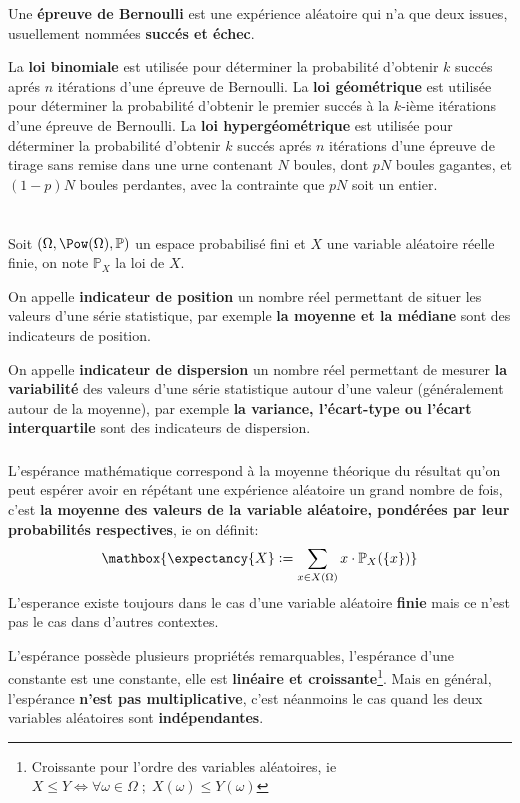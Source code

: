 Une \textbf{épreuve de Bernoulli} est une expérience aléatoire qui n'a que deux issues, usuellement nommées \textbf{succés et échec}.\<

La \textbf{loi binomiale} est utilisée pour déterminer la probabilité d'obtenir \(k\) succés aprés \(n\) itérations d'une épreuve de Bernoulli. \+
La \textbf{loi géométrique} est utilisée pour déterminer la probabilité d'obtenir le premier succés à la \(k\)-ième itérations d'une épreuve de Bernoulli.\+
La \textbf{loi hypergéométrique} est utilisée pour déterminer la probabilité d'obtenir \(k\) succés aprés \(n\) itérations d'une épreuve de tirage sans remise dans une urne contenant \(N\) boules, dont \(pN\) boules gagantes, et \((1-p)N\) boules perdantes, avec la contrainte que \(pN\) soit un entier.\+


\chapter*{}
Soit \((\Omega, \Pow(\Omega), \mathbb{P})\) un espace probabilisé fini et \(X\) une variable aléatoire réelle finie, on note \(\mathbb{P}_X\) la loi de \(X\). \<

On appelle \textbf{indicateur de position} un nombre réel permettant de situer les valeurs d'une série statistique, par exemple \textbf{la moyenne et la médiane} sont des indicateurs de position.\<

On appelle \textbf{indicateur de dispersion} un nombre réel permettant de mesurer \textbf{la variabilité} des valeurs d'une série statistique autour d'une valeur (généralement autour de la moyenne), par exemple \textbf{la variance, l'écart-type ou l'écart interquartile} sont des indicateurs de dispersion.

\subsection*{}
L'espérance mathématique correspond à la moyenne théorique du résultat qu'on peut espérer avoir en répétant une expérience aléatoire un grand nombre de fois, c'est \textbf{la moyenne des valeurs de la variable aléatoire, pondérées par leur probabilités respectives}, ie on définit:
\[
   \mathbox{
      \expectancy{X} := \sum_{x \in X(\Omega)} x\cdot\mathbb{P}_X(\{x\})
   }   
\]
L'esperance existe toujours dans le cas d'une variable aléatoire \textbf{finie} mais ce n'est pas le cas dans d'autres contextes. \<

L'espérance possède plusieurs propriétés remarquables, l'espérance d'une constante est une constante, elle est \textbf{linéaire et croissante}\footnote{Croissante pour l'ordre des variables aléatoires, ie \(X \leq Y \Longleftrightarrow \forall \omega \in \Omega \; ; \; X(\omega) \leq Y(\omega)\)}.\+
Mais en général, l'espérance \textbf{n'est pas multiplicative}, c'est néanmoins le cas quand les deux variables aléatoires sont \textbf{indépendantes}.\<


